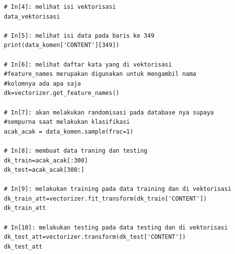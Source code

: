 \begin{enumerate}
\begin{verbatim}
# In[4]: melihat isi vektorisasi 
data_vektorisasi

# In[5]: melihat isi data pada baris ke 349
print(data_komen['CONTENT'][349])

# In[6]: melihat daftar kata yang di vektorisasi
#feature_names merupakan digunakan untuk mengambil nama 
#kolomnya ada apa saja
dk=vectorizer.get_feature_names()

# In[7]: akan melakukan randomisasi pada database nya supaya 
#sempurna saat melakukan klasifikasi
acak_acak = data_komen.sample(frac=1)

# In[8]: membuat data traning dan testing
dk_train=acak_acak[:300]
dk_test=acak_acak[300:]

# In[9]: melakukan training pada data training dan di vektorisasi
dk_train_att=vectorizer.fit_transform(dk_train['CONTENT'])
dk_train_att

# In[10]: melakukan testing pada data testing dan di vektorisasi
dk_test_att=vectorizer.transform(dk_test['CONTENT'])
dk_test_att


\end{verbatim}
\end{enumerate}
